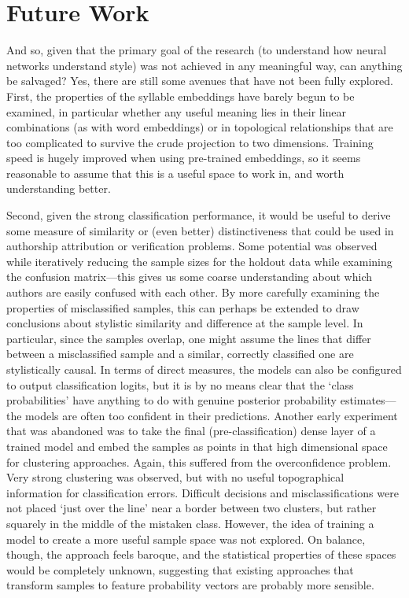 \documentclass[
    twocolumn,
    hf,
]{ceurart}
\begin{document}
\section{Future Work}

And so, given that the primary goal of the research (to understand how neural
networks understand style) was not achieved in any meaningful way, can anything
be salvaged? Yes, there are still some avenues that have not been fully
explored. First, the properties of the syllable embeddings have barely begun to
be examined, in particular whether any useful meaning lies in their linear
combinations (as with word embeddings) or in topological relationships that are
too complicated to survive the crude projection to two dimensions. Training
speed is hugely improved when using pre-trained embeddings, so it seems
reasonable to assume that this is a useful space to work in, and worth
understanding better.

Second, given the strong classification performance, it would be useful to
derive some measure of similarity or (even better) distinctiveness that could be
used in authorship attribution or verification problems. Some potential was
observed while iteratively reducing the sample sizes for the holdout data while
examining the confusion matrix---this gives us some coarse understanding about
which authors are easily confused with each other. By more carefully examining
the properties of misclassified samples, this can perhaps be extended to draw
conclusions about stylistic similarity and difference at the sample level. In
particular, since the samples overlap, one might assume the lines that differ
between a misclassified sample and a similar, correctly classified one are
stylistically causal. In terms of direct measures, the models can also be
configured to output classification logits, but it is by no means clear that the
`class probabilities' have anything to do with genuine posterior probability
estimates---the models are often too confident in their predictions. Another
early experiment that was abandoned was to take the final (pre-classification)
dense layer of a trained model and embed the samples as points in that high
dimensional space for clustering approaches. Again, this suffered from the
overconfidence problem. Very strong clustering was observed, but with no useful
topographical information for classification errors. Difficult decisions and
misclassifications were not placed `just over the line' near a border between
two clusters, but rather squarely in the middle of the mistaken class. However,
the idea of training a model to create a more useful sample space was not
explored. On balance, though, the approach feels baroque, and the statistical
properties of these spaces would be completely unknown, suggesting that existing
approaches that transform samples to feature probability vectors are probably
more sensible.
\end{document}
